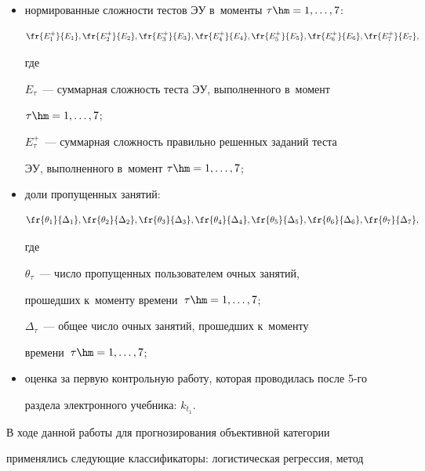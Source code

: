      \begin{itemize}


\item нормированные сложности тестов ЭУ в~моменты $\tau\hm= 1, \ldots , 


7$:


$$


\fr{E_1^+}{E_1}, \fr{E_2^+}{E_2}, \fr{E_3^+}{E_3}, \fr{E_4^+}{E_4}, 


\fr{E_5^+}{E_5}, \fr{E_6^+}{E_6}, \fr{E_7^+}{E_7},


$$


где


     $E_\tau$~--- суммарная сложность теста ЭУ, выполненного в~момент 


$\tau\hm= 1, \ldots , 7$;


     $E_\tau^+$~--- суммарная сложность правильно решенных заданий теста 


ЭУ, выполненного в~момент $\tau\hm= 1, \ldots , 7$;


\item доли пропущенных занятий:


$$


\fr{\theta_1}{\Delta_1},  \fr{\theta_2}{\Delta_2},  \fr{\theta_3}{\Delta_3},


\fr{\theta_4}{\Delta_4}, \fr{\theta_5}{\Delta_5}, 


\fr{\theta_6}{\Delta_6},\fr{\theta_7}{\Delta_7},


$$


где


     $\theta_\tau$~--- число пропущенных пользователем очных занятий, 


прошедших к~моменту времени~$\tau\hm= 1, \ldots , 7$;


     $\Delta_\tau$~--- общее число очных занятий, прошедших к~моменту 


времени~$\tau\hm= 1, \ldots , 7$;


\item оценка за первую контрольную работу, которая проводилась после 5-го 


раздела электронного учебника: $k_{t_1}$.


\end{itemize}


     


     В ходе данной работы для прогнозирования объективной категории 


применялись следующие классификаторы: логистическая регрессия, метод 



